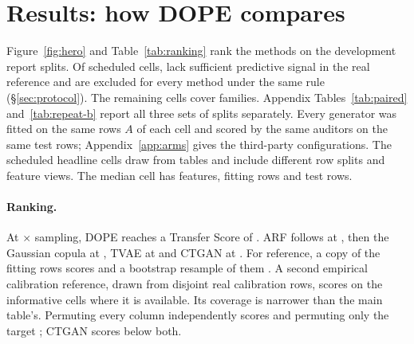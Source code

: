 \section{Results: how DOPE compares}\label{sec:results}

\begin{table}[t]
  \centering\footnotesize\setlength{\tabcolsep}{3pt}
  \caption{The report look (receipt \texttt{}), ranked by Transfer Score, $\VThree{ScoreScale}\times(1+\mathrm{TRG})$, at $\times$ sampling; a real twin of the fitting split scores . Panel (a) gives the score with its  family-bootstrap interval, the score at matched size ($m=\VThree{MatchedMult}$), the score per task and the median whole-file size. Panel (b) gives realism and privacy coverage (shares of informative entries passing each gate), the mean (and maximum) exact-copy excess, the median C2ST AUC (chance level means indistinguishable) and failed over scored cells. The third-party generators ran with library defaults and no byte cap. The reference rows below the rule are not generators: a copy and a bootstrap of the fitting rows, every column permuted independently, and only the target permuted.}
  \label{tab:ranking}
  
\end{table}

Figure~\ref{fig:hero} and Table~\ref{tab:ranking} rank the methods on the development report splits. Of  scheduled cells,  lack sufficient predictive signal in the real reference and are excluded for every method under the same rule (\S\ref{sec:protocol}). The remaining  cells cover  families. Appendix Tables~\ref{tab:paired} and~\ref{tab:repeat-b} report all three sets of splits separately.
Every generator was fitted on the same rows $A$ of each cell and scored by the same auditors on the same test rows; Appendix~\ref{app:arms} gives the third-party configurations.
The scheduled headline cells draw from  tables and include different row splits and feature views. The median cell has  features,  fitting rows and  test rows.

\paragraph{Ranking.}
At $\times$ sampling, DOPE reaches a Transfer Score of .
ARF follows at , then the Gaussian copula at , TVAE at  and CTGAN at .
For reference, a copy of the fitting rows scores  and a bootstrap resample of them .
A second empirical calibration reference, drawn from disjoint real calibration rows, scores  on the  informative cells where it is available. Its coverage is narrower than the main table's.
Permuting every column independently scores  and permuting only the target ; CTGAN scores below both.

